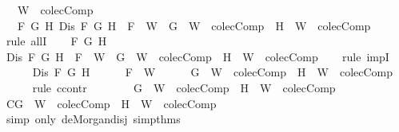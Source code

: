 \begin{isabellebody}
\ \ \ {\isachardoublequoteopen}W\ {\isasymin}\ colecComp{\isachardoublequoteclose}\isanewline
\ \ \ {\isachardoublequoteopen}{\isasymforall}F\ G\ H{\isachardot}\ Dis\ F\ G\ H\ {\isasymlongrightarrow}\ F\ {\isasymin}\ W\ {\isasymlongrightarrow}\ {\isacharbraceleft}G{\isacharbraceright}\ {\isasymunion}\ W\ {\isasymin}\ colecComp\ {\isasymor}\ {\isacharbraceleft}H{\isacharbraceright}\ {\isasymunion}\ W\ {\isasymin}\ colecComp{\isachardoublequoteclose}\isanewline
%
\isadelimproof
%
\endisadelimproof
%
\isatagproof
{}\isamarkupfalse%
\ {\isacharparenleft}rule\ allI{\isacharparenright}{\isacharplus}\isanewline
\ \ \isamarkupfalse%
\ F\ G\ H\isanewline
\ \ \isamarkupfalse%
\ {\isachardoublequoteopen}Dis\ F\ G\ H\ {\isasymlongrightarrow}\ F\ {\isasymin}\ W\ {\isasymlongrightarrow}\ {\isacharbraceleft}G{\isacharbraceright}\ {\isasymunion}\ W\ {\isasymin}\ colecComp\ {\isasymor}\ {\isacharbraceleft}H{\isacharbraceright}\ {\isasymunion}\ W\ {\isasymin}\ colecComp{\isachardoublequoteclose}\isanewline
\ \ \isamarkupfalse%
\ {\isacharparenleft}rule\ impI{\isacharparenright}{\isacharplus}\isanewline
\ \ \ \ \isamarkupfalse%
\ {\isachardoublequoteopen}Dis\ F\ G\ H{\isachardoublequoteclose}\isanewline
\ \ \ \ \isamarkupfalse%
\ {\isachardoublequoteopen}F\ {\isasymin}\ W{\isachardoublequoteclose}\isanewline
\ \ \ \ \isamarkupfalse%
\ {\isachardoublequoteopen}{\isacharbraceleft}G{\isacharbraceright}\ {\isasymunion}\ W\ {\isasymin}\ colecComp\ {\isasymor}\ {\isacharbraceleft}H{\isacharbraceright}\ {\isasymunion}\ W\ {\isasymin}\ colecComp{\isachardoublequoteclose}\isanewline
\ \ \ \ \isamarkupfalse%
\ {\isacharparenleft}rule\ ccontr{\isacharparenright}\isanewline
\ \ \ \ \ \ \isamarkupfalse%
\ {\isachardoublequoteopen}{\isasymnot}{\isacharparenleft}{\isacharbraceleft}G{\isacharbraceright}\ {\isasymunion}\ W\ {\isasymin}\ colecComp\ {\isasymor}\ {\isacharbraceleft}H{\isacharbraceright}\ {\isasymunion}\ W\ {\isasymin}\ colecComp{\isacharparenright}{\isachardoublequoteclose}\isanewline
\ \ \ \ \ \ \isamarkupfalse%
\ \isamarkupfalse%
\ C{\isacharcolon}{\isachardoublequoteopen}{\isacharbraceleft}G{\isacharbraceright}\ {\isasymunion}\ W\ {\isasymnotin}\ colecComp\ {\isasymand}\ {\isacharbraceleft}H{\isacharbraceright}\ {\isasymunion}\ W\ {\isasymnotin}\ colecComp{\isachardoublequoteclose}\isanewline
\ \ \ \ \ \ \ \ \isamarkupfalse%
\ {\isacharparenleft}simp\ only{\isacharcolon}\ de{\isacharunderscore}Morgan{\isacharunderscore}disj\ simp{\isacharunderscore}thms{\isacharparenleft}{}{\isacharparenright}{\isacharparenright}\isanewline

\end{isabellebody}
